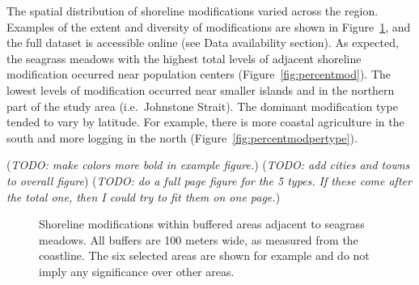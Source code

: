 \documentclass[12pt]{article}\usepackage[]{graphicx}\usepackage[]{color}
\begin{document}
The spatial distribution of shoreline modifications varied across the region. Examples of the extent and diversity of modifications are shown in Figure~\ref{fig:exampleareas}, and the full dataset is accessible online (see Data availability section). As expected, the seagrass meadows with the highest total levels of adjacent shoreline modification occurred near population centers (Figure~\ref{fig:percentmod}). The lowest levels of modification occurred near smaller islands and in the northern part of the study area (i.e.~Johnstone Strait). The dominant modification type tended to vary by latitude. For example, there is more coastal agriculture in the south and more logging in the north (Figure~\ref{fig:percentmodpertype}).

(\emph{TODO: make colors more bold in example figure.}) (\emph{TODO: add cities and towns to overall figure}) (\emph{TODO: do a full page figure for the 5 types. If these come after the total one, then I could try to fit them on one page.})
\begin{figure}[H]

{\centering {} 

}

\caption{Shoreline modifications within buffered areas adjacent to seagrass meadows. All buffers are 100 meters wide, as measured from the coastline. The six selected areas are shown for example and do not imply any significance over other areas.}\label{fig:exampleareas}
\end{figure}
\end{document}
